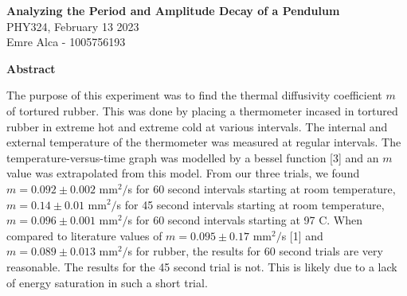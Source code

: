 \documentclass[11pt]{article}
\begin{document}
\begin{center}
    \Large {}  \textbf{Analyzing the Period and Amplitude Decay of a Pendulum}\\
    \vspace{5pt} 
    \large PHY324, February 13 2023\\
    \vspace{5pt}
    Emre Alca - 1005756193
\end{center}

\nd \hrulefill

\vspace{15pt}



 \selectfont \textbf{Abstract}

 \selectfont 


The purpose of this experiment was to find the thermal diffusivity coefficient $m$ of tortured rubber. This was done by placing a thermometer incased in tortured rubber in extreme hot and extreme cold at various intervals. The internal and external temperature of the thermometer was measured at regular intervals. The temperature-versus-time graph was modelled by a bessel function [3] and an $m$ value was extrapolated from this model. From our three trials, we found $m = 0.092 \pm 0.002$ mm$^2/$s for 60 second intervals starting at room temperature, $m = 0.14 \pm 0.01$ mm$^2/$s for 45 second intervals starting at room temperature, $m = 0.096 \pm 0.001$ mm$^2/$s for 60 second intervals starting at 97 \textdegree C. When compared to literature values of $m = 0.095 \pm 0.17$ mm$^2/$s [1] and $m = 0.089 \pm 0.013$ mm$^2/$s for rubber, the results for 60 second trials are very reasonable. The results for the 45 second trial is not. This is likely due to a lack of energy saturation in such a short trial.


\nd \hrulefill

\vspace{5pt}
\end{document}
